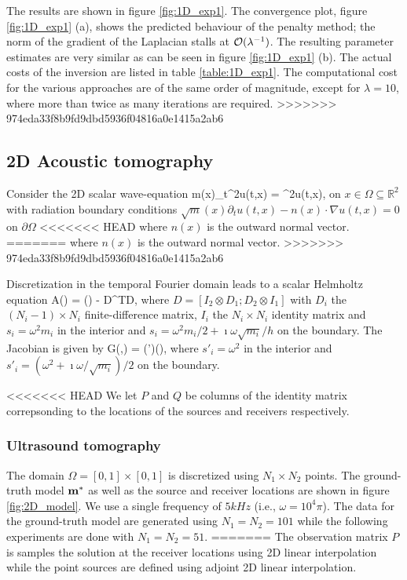 \documentclass{iopart}
\begin{document}
{The results are shown in figure \ref{fig:1D_exp1}. The convergence plot, figure \ref{fig:1D_exp1} (a), shows the predicted behaviour of the penalty method; the norm
of the gradient of the Laplacian stalls at $\mathcal{O}(\lambda^{-1})$. The resulting parameter estimates are very similar as can be seen 
in figure \ref{fig:1D_exp1} (b). The actual costs of the inversion are listed in table \ref{table:1D_exp1}. The computational cost for the various approaches are of the same order of magnitude, except for $\lambda=10$, where more than twice as many iterations are required. 
>>>>>>> 974eda33f8b9fd9dbd5936f04816a0e1415a2ab6

\subsection{2D Acoustic tomography}
Consider the 2D scalar wave-equation
\bq
m(x)\partial_t^2u(t,x) = \nabla^2u(t,x),
\eq
on $x \in \Omega \subseteq \mathbb{R}^2$  with radiation boundary conditions $\sqrt{m}(x)\partial_tu(t,x) - n(x)\cdot\nabla u(t,x) = 0$ on $\partial\Omega$
<<<<<<< HEAD
where $n(x)$ is the outward normal vector.
=======
where $n(x)$ is the outward normal vector. 
>>>>>>> 974eda33f8b9fd9dbd5936f04816a0e1415a2ab6

Discretization in the temporal Fourier domain leads to a scalar Helmholtz equation
\bq
A() = () - D^TD,
\eq
where $D = [I_2\otimes D_1; D_2\otimes I_1]$ with $D_i$ the $(N_i-1)\times N_i$ finite-difference matrix, $I_i$ the $N_i\times N_i$ identity matrix
and $s_i = \omega^2 m_i$ in the interior and $s_i = \omega^2 m_i/2 + \imath\omega\sqrt{m_i}/h$ on the boundary.
The Jacobian is given by
\bq
G(,) = (')(),
\eq
where $s'_i = \omega^2$ in the interior and $s'_i = (\omega^2 + \imath\omega/\sqrt{m_i})/2$ on the boundary.

<<<<<<< HEAD
We let $P$ and $Q$ be columns of the identity matrix correpsonding
to the locations of the sources and receivers respectively.

\subsubsection{Ultrasound tomography}

The domain $\Omega = [0,1]\times [0,1]$ is discretized using $N_1\times N_2$ points. 
The ground-truth model $\mathbf{m}^*$ as well as the source and receiver locations are shown in figure  \ref{fig:2D_model}. We use a single frequency of $5 kHz$ (i.e., $\omega = 10^4\pi$). The data for the ground-truth model are generated using $N_1=N_2=101$ while the following experiments are done with $N_1=N_2=51$.
=======
The observation matrix $P$ is samples the solution at the receiver locations using 2D linear interpolation while the point sources are defined using adjoint 2D linear interpolation.

}
\end{document}
